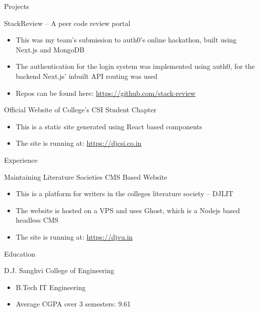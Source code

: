 \documentclass{article}
\newlength{\tabin}
\newlength{\secsep}
\newcommand{\lineunder}{\vspace*{-8pt} \\ \hspace*{-6pt} \hrulefill \\ \vspace*{-15pt}}
\newenvironment{tabbedsection}[1]{
  \begin{list}{}{
      \setlength{\itemsep}{0pt}
      \setlength{\labelsep}{0pt}
      \setlength{\labelwidth}{0pt}
      \setlength{\leftmargin}{\tabin}
      \setlength{\rightmargin}{\tabin}
      \setlength{\listparindent}{0pt}
      \setlength{\parsep}{0pt}
      \setlength{\parskip}{0pt}
      \setlength{\partopsep}{0pt}
      \setlength{\topsep}{#1}
    }
  \item[]
}{\end{list}}
\newenvironment{resume_section}[1]{
  \filbreak
  \vspace{2\secsep}
  \textsc{\large#1}
  \lineunder
  \begin{tabbedsection}{\secsep}
}{\end{tabbedsection}}
\newenvironment{resume_subsection}[2][]{
  \textbf{#2} \hfill {\footnotesize #1} \hspace{2em}
  \begin{tabbedsection}{0.5\secsep}
}{\end{tabbedsection}}
\newenvironment{subitems}{
  \renewcommand{\labelitemi}{-}
  \begin{itemize}
      \setlength{\labelsep}{1em}
}{\end{itemize}}
\begin{document}
\begin{resume_section}{Projects}
    \begin{resume_subsection}{StackReview -- A peer code review portal}
        \begin{subitems}
            \item This was my team's submission to auth0's online hackathon, built using Next.js and MongoDB
            \item The authentication for the login system was implemented using auth0, for the backend Next.js' inbuilt API routing was used
            \item Repos can be found here: \href{https://github.com/stack-review}{https://github.com/stack-review}
        \end{subitems}
    \end{resume_subsection}
    \begin{resume_subsection}{Official Website of College's CSI Student Chapter}
        \begin{subitems}
            \item This is a static site generated using React based components
            \item The site is running at: \href{https://djcsi.co.in}{https://djcsi.co.in}
        \end{subitems}
    \end{resume_subsection}
\end{resume_section}

\begin{resume_section}{Experience}
    \begin{resume_subsection}{Maintaining Literature Societies CMS Based Website}
        \begin{subitems}
            \item This is a platform for writers in the colleges literature society -- DJLIT
            \item The website is hosted on a VPS and uses Ghost, which is a Nodejs based headless CMS
            \item The site is running at: \href{https://djvu.in}{https://djvu.in}
        \end{subitems}
    \end{resume_subsection}
\end{resume_section}

\begin{resume_section}{Education}
    \begin{resume_subsection}[2019 - 2023 (expected)]{D.J. Sanghvi College of Engineering}
        \begin{subitems}
            \item B.Tech IT Engineering
            \item Average CGPA over 3 semesters: 9.61
        \end{subitems}
  \end{resume_subsection}
\end{resume_section}

\vspace{1cm}
\end{document}
